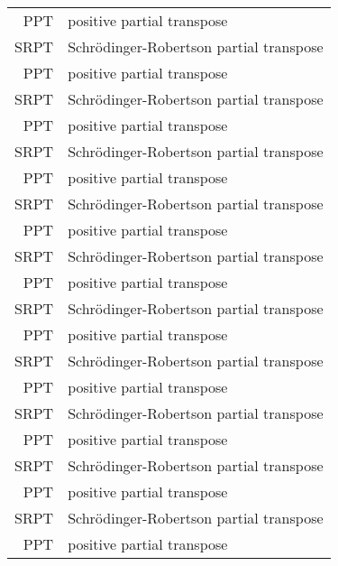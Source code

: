 \begin{longtable}{rl}
    PPT  & positive partial transpose                \\
    SRPT & Schr\"odinger-Robertson partial transpose \\
    PPT  & positive partial transpose                \\
    SRPT & Schr\"odinger-Robertson partial transpose \\
    PPT  & positive partial transpose                \\
    SRPT & Schr\"odinger-Robertson partial transpose \\
    PPT  & positive partial transpose                \\
    SRPT & Schr\"odinger-Robertson partial transpose \\
    PPT  & positive partial transpose                \\
    SRPT & Schr\"odinger-Robertson partial transpose \\
    PPT  & positive partial transpose                \\
    SRPT & Schr\"odinger-Robertson partial transpose \\
    PPT  & positive partial transpose                \\
    SRPT & Schr\"odinger-Robertson partial transpose \\
    PPT  & positive partial transpose                \\
    SRPT & Schr\"odinger-Robertson partial transpose \\
    PPT  & positive partial transpose                \\
    SRPT & Schr\"odinger-Robertson partial transpose \\
    PPT  & positive partial transpose                \\
    SRPT & Schr\"odinger-Robertson partial transpose \\
    PPT  & positive partial transpose
\end{longtable}